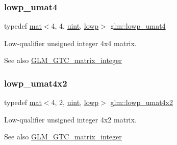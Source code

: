\subsubsection{\texorpdfstring{lowp\+\_\+umat4}{lowp\_umat4}}
{\footnotesize\ttfamily typedef \mbox{\hyperlink{structglm_1_1mat}{mat}}$<$4, 4, \mbox{\hyperlink{group__core__precision_ga4fd29415871152bfb5abd588334147c8}{uint}}, \mbox{\hyperlink{namespaceglm_a36ed105b07c7746804d7fdc7cc90ff25ae161af3fc695e696ce3bf69f7332bc2d}{lowp}}$>$ \mbox{\hyperlink{group__gtc__matrix__integer_ga41cc5d910308e4b471aa6543ce22dd20}{glm\+::lowp\+\_\+umat4}}}

Low-\/qualifier unsigned integer 4x4 matrix. \begin{DoxySeeAlso}{See also}
\mbox{\hyperlink{group__gtc__matrix__integer}{G\+L\+M\+\_\+\+G\+T\+C\+\_\+matrix\+\_\+integer}} 
\end{DoxySeeAlso}
\mbox{\label{group__gtc__matrix__integer_ga3fbd04409a7da041e61b868a002089f2}} 
\subsubsection{\texorpdfstring{lowp\+\_\+umat4x2}{lowp\_umat4x2}}
{\footnotesize\ttfamily typedef \mbox{\hyperlink{structglm_1_1mat}{mat}}$<$4, 2, \mbox{\hyperlink{group__core__precision_ga4fd29415871152bfb5abd588334147c8}{uint}}, \mbox{\hyperlink{namespaceglm_a36ed105b07c7746804d7fdc7cc90ff25ae161af3fc695e696ce3bf69f7332bc2d}{lowp}}$>$ \mbox{\hyperlink{group__gtc__matrix__integer_ga3fbd04409a7da041e61b868a002089f2}{glm\+::lowp\+\_\+umat4x2}}}

Low-\/qualifier unsigned integer 4x2 matrix. \begin{DoxySeeAlso}{See also}
\mbox{\hyperlink{group__gtc__matrix__integer}{G\+L\+M\+\_\+\+G\+T\+C\+\_\+matrix\+\_\+integer}} 
\end{DoxySeeAlso}
\mbox{\label{group__gtc__matrix__integer_ga5eb6bfe468dd615e0a78fb9f3ca813c6}} 
